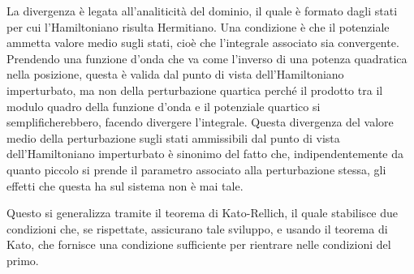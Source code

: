 \documentclass[11pt, a4paper]{scrartcl}
\numberwithin{equation}{subsection}
\theoremstyle{style1}
\begin{document}
La divergenza \`e legata all'analiticit\`a del dominio, il quale \`e formato dagli stati per cui l'Hamiltoniano risulta Hermitiano.
Una condizione \`e che il potenziale ammetta valore medio sugli stati, cio\`e che l'integrale associato sia convergente. 
Prendendo una funzione d'onda che va come l'inverso di una potenza quadratica nella posizione, questa \`e valida dal punto di vista dell'Hamiltoniano imperturbato, ma non della perturbazione quartica perch\'e il prodotto tra il modulo quadro della funzione d'onda e il potenziale quartico si semplificherebbero, facendo divergere l'integrale.
Questa divergenza del valore medio della perturbazione sugli stati ammissibili dal punto di vista dell'Hamiltoniano imperturbato \`e sinonimo del fatto che, indipendentemente da quanto piccolo si prende il parametro associato alla perturbazione stessa, gli effetti che questa ha sul sistema non \`e mai tale.

Questo si generalizza tramite il teorema di Kato-Rellich, il quale stabilisce due condizioni che, se rispettate, assicurano tale sviluppo, e usando il teorema di Kato, che fornisce una condizione sufficiente per rientrare nelle condizioni del primo.
\end{document}
